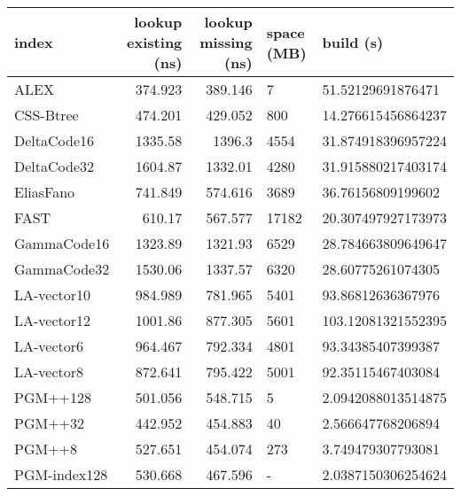 \begin{tabular}{lrrll}
\hline
 index             &   lookup existing (ns) &   lookup missing (ns) & space (MB)   & build (s)             \\
\hline
 ALEX              &                374.923 &               389.146 & 7            & 51.52129691876471     \\
 CSS-Btree         &                474.201 &               429.052 & 800          & 14.276615456864237    \\
 DeltaCode16       &               1335.58  &              1396.3   & 4554         & 31.874918396957224    \\
 DeltaCode32       &               1604.87  &              1332.01  & 4280         & 31.915880217403174    \\
 EliasFano         &                741.849 &               574.616 & 3689         & 36.76156809199602     \\
 FAST              &                610.17  &               567.577 & 17182        & 20.307497927173973    \\
 GammaCode16       &               1323.89  &              1321.93  & 6529         & 28.784663809649647    \\
 GammaCode32       &               1530.06  &              1337.57  & 6320         & 28.60775261074305     \\
 LA-vector10       &                984.989 &               781.965 & 5401         & 93.86812636367976     \\
 LA-vector12       &               1001.86  &               877.305 & 5601         & 103.12081321552395    \\
 LA-vector6        &                964.467 &               792.334 & 4801         & 93.34385407399387     \\
 LA-vector8        &                872.641 &               795.422 & 5001         & 92.35115467403084     \\
 PGM++128          &                501.056 &               548.715 & 5            & 2.0942088013514875    \\
 PGM++32           &                442.952 &               454.883 & 40           & 2.566647768206894     \\
 PGM++8            &                527.651 &               454.074 & 273          & 3.749479307793081     \\
 PGM-index128      &                530.668 &               467.596 & -            & 2.0387150306254624    \\

\end{tabular}
